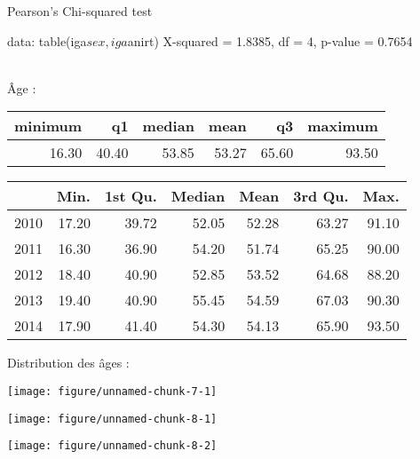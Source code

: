 \documentclass[11pt,a4paper]{article}\usepackage[]{graphicx}\usepackage[]{color}
\makeatletter
\def\maxwidth{ %
  \ifdim\Gin@nat@width>\linewidth
    \linewidth
  \else
    \Gin@nat@width
  \fi
}
\newenvironment{knitrout}{}{} %
\makeatother
\begin{document}
	Pearson's Chi-squared test

data:  table(iga$sex, iga$anirt)
X-squared = 1.8385, df = 4, p-value = 0.7654


~\\

Âge :

\begin{table}[ht]
\centering
\begin{tabular}{rrrrrr}
  \hline
minimum & q1 & median & mean & q3 & maximum \\ 
  \hline
16.30 & 40.40 & 53.85 & 53.27 & 65.60 & 93.50 \\ 
   \hline
\end{tabular}
\end{table}
\begin{table}[H]
\centering
\begin{tabular}{rrrrrrr}
  \hline
 & Min. & 1st Qu. & Median & Mean & 3rd Qu. & Max. \\ 
  \hline
2010 & 17.20 & 39.72 & 52.05 & 52.28 & 63.27 & 91.10 \\ 
  2011 & 16.30 & 36.90 & 54.20 & 51.74 & 65.25 & 90.00 \\ 
  2012 & 18.40 & 40.90 & 52.85 & 53.52 & 64.68 & 88.20 \\ 
  2013 & 19.40 & 40.90 & 55.45 & 54.59 & 67.03 & 90.30 \\ 
  2014 & 17.90 & 41.40 & 54.30 & 54.13 & 65.90 & 93.50 \\ 
   \hline
\end{tabular}
\end{table}


Distribution des âges :

\begin{knitrout}
\color{fgcolor}
\texttt{[image: figure/unnamed-chunk-7-1]} 

\end{knitrout}


\begin{knitrout}
\color{fgcolor}
\texttt{[image: figure/unnamed-chunk-8-1]} 

\texttt{[image: figure/unnamed-chunk-8-2]} 

\end{knitrout}
\end{document}
